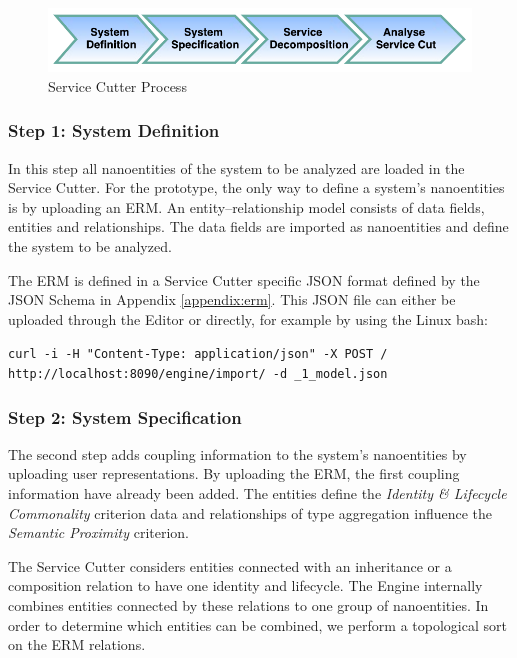 \begin{figure}[H]
	\begin{center}
		\includegraphics[scale=1]{diagrams/process.pdf}
		\caption{Service Cutter Process}
		\label{fig:process}
	\end{center}
\end{figure}

\subsubsection{Step 1: System Definition}

In this step all nanoentities of the system to be analyzed are loaded in the Service Cutter. For the prototype, the only way to define a system's nanoentities is by uploading an \gls{ERM}. An entity–relationship model consists of data fields, entities and relationships. The data fields are imported as nanoentities and define the system to be analyzed.  

The \gls{ERM} is defined in a Service Cutter specific \gls{JSON} format defined by the \gls{JSON} Schema\cite{jsonSchema} in Appendix \ref{appendix:erm}. This \gls{JSON} file can either be uploaded through the Editor or directly, for example by using the Linux bash:

\texttt{curl -i -H "Content-Type: application/json" -X POST /} \\
\-\hspace{40pt}\texttt{http://localhost:8090/engine/import/ -d \@booking\_1\_model.json}

\subsubsection{Step 2: System Specification}

The second step adds coupling information to the system's nanoentities by uploading user representations. By uploading the \gls{ERM}, the first coupling information have already been added. The entities define the \textit{Identity \& Lifecycle Commonality} criterion data and relationships of type aggregation influence the \textit{Semantic Proximity} criterion.

The Service Cutter considers entities connected with an inheritance or a composition relation to have one identity and lifecycle. The Engine internally combines entities connected by these relations to one group of nanoentities. In order to determine which entities can be combined, we perform a topological sort\cite{pang2015topological} on the \gls{ERM} relations. 

